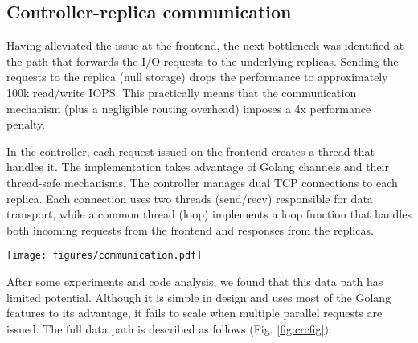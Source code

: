 \subsection{Controller-replica communication}

Having alleviated the issue at the frontend, the next bottleneck was identified at the path that forwards the I/O requests to the underlying replicas. Sending the requests to the replica (null storage) drops the performance to approximately 100k read/write IOPS. This practically means that the communication mechanism (plus a negligible routing overhead) imposes a 4x performance penalty.

In the controller, each request issued on the frontend creates a thread that handles it. The implementation takes advantage of Golang channels and their thread-safe mechanisms. The controller manages dual TCP connections to each replica. Each connection uses two threads (send/recv) responsible for data transport, while a common thread (loop) implements a loop function that handles both incoming requests from the frontend and responses from the replicas.

\begin{figure*}[tb]
    \centering
    \texttt{[image: figures/communication.pdf]}
    \caption{Original vs. modified controller-replica communication implementation.}
    \label{fig:crcfig}
\end{figure*}

After some experiments and code analysis, we found that this data path has limited potential. Although it is simple in design and uses most of the Golang features to its advantage, it fails to scale when multiple parallel requests are issued. The full data path is described as follows (Fig. \ref{fig:crcfig}):


